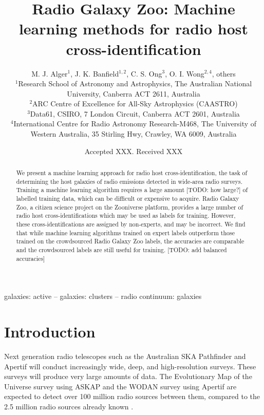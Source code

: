 \documentclass[fleqn,usenatbib,usedcolumn]{mnras}
\title[ML CDFS]{Radio Galaxy Zoo: Machine learning methods for radio host cross-identification}
\author[RGZ ML Team]{M. J. Alger$^{1}$, J. K. Banfield$^{1, 2}$, C. S. Ong$^{3}$, O. I. Wong$^{2, 4}$, others
\\
$^{1}$Research School of Astronomy and Astrophysics, The Australian National University, Canberra ACT 2611, Australia\\
$^{2}$ARC Centre of Excellence for All-Sky Astrophysics (CAASTRO)\\
$^{3}$Data61, CSIRO, 7 London Circuit, Canberra ACT 2601, Australia\\
$^{4}$International Centre for Radio Astronomy Research-M468, The University of Western Australia, 35 Stirling Hwy, Crawley, WA 6009, Australia
}
\date{Accepted XXX. Received XXX}
\begin{document}
\label{firstpage}
\pagerange{\pageref{firstpage}--\pageref{lastpage}}
\maketitle

\begin{abstract}
  We present a machine learning approach for radio host cross-identification,
  the task of determining the host galaxies of radio emissions detected in
  wide-area radio surveys. Training a machine learning algorithm requires a
  large amount [TODO: how large?] of labelled training data, which can be
  difficult or expensive to acquire. Radio Galaxy Zoo, a citizen science
  project on the Zooniverse platform, provides a large number of radio host
  cross-identifications which may be used as labels for training. However,
  these cross-identifications are assigned by non-experts, and may be
  incorrect. We find that while machine learning algorithms trained on expert
  labels outperform those trained on the crowdsourced Radio Galaxy Zoo labels,
  the accuracies are comparable and the crowdsourced labels are still useful
  for training. [TODO: add balanced accuracies]
\end{abstract}

\begin{keywords}
galaxies: active -- galaxies: clusters -- radio continuum: galaxies
\end{keywords}


\section{Introduction}\label{introduction}

  Next generation radio telescopes such as the Australian SKA Pathfinder
  \citep[ASKAP;][]{johnston07} and Apertif \citep{verheijen08} will
  conduct increasingly wide, deep, and high-resolution surveys. These
  surveys will produce very large amounts of data. The Evolutionary Map of
  the Universe survey \citep[EMU;][]{norris11} using ASKAP and the WODAN
  survey \citep{rottgering11} using Apertif are expected to detect
  over 100 million radio sources between them, compared to the 2.5 million
  radio sources already known \citep{banfield15}.
\end{document}
